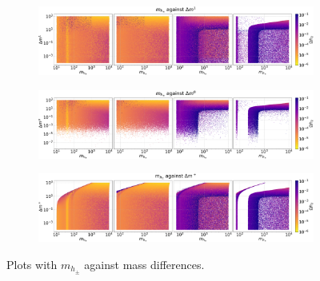 \documentclass[12pt]{article}
\begin{document}
\begin{figure}[H]
    \begin{subfigure}[b]{\columnwidth}
      \centering
      \includegraphics[width=1\columnwidth]{4plot/MDP_DM2.pdf}
    \end{subfigure}
    
    \begin{subfigure}[b]{\columnwidth}
      \centering
      \includegraphics[width=1\columnwidth]{4plot/MDP_DM3.pdf}
    \end{subfigure}

    \begin{subfigure}[b]{\columnwidth}
      \centering
      \includegraphics[width=1\columnwidth]{4plot/MDP_DMP.pdf}
    \end{subfigure}
    \caption{Plots with $m_{h_\pm}$ against mass differences.}
\end{figure}
\end{document}

